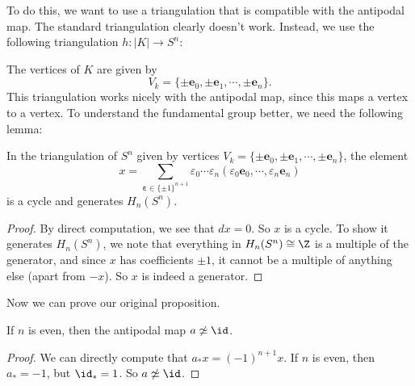 \documentclass[a4paper]{article}
\begin{document}
To do this, we want to use a triangulation that is compatible with the antipodal map. The standard triangulation clearly doesn't work. Instead, we use the following triangulation $h: |K| \to S^n$:
\begin{center}
\end{center}
The vertices of $K$ are given by
\[
  V_k = \{\pm\mathbf{e}_0, \pm \mathbf{e}_1, \cdots, \pm\mathbf{e}_n\}.
\]
This triangulation works nicely with the antipodal map, since this maps a vertex to a vertex. To understand the fundamental group better, we need the following lemma:

\begin{lemma}
  In the triangulation of $S^n$ given by vertices $V_k = \{\pm\mathbf{e}_0, \pm \mathbf{e}_1, \cdots, \pm\mathbf{e}_n\}$, the element
  \[
    x = \sum_{\boldsymbol\varepsilon \in \{\pm 1\}^{n + 1}} \varepsilon_0 \cdots \varepsilon_n (\varepsilon_0 \mathbf{e}_0, \cdots, \varepsilon_n \mathbf{e}_n)
  \]
  is a cycle and generates $H_n(S^n)$.
\end{lemma}

\begin{proof}
  By direct computation, we see that $d x = 0$. So $x$ is a cycle. To show it generates $H_n(S^n)$, we note that everything in $H_n(S^n) \cong \Z$ is a multiple of the generator, and since $x$ has coefficients $\pm 1$, it cannot be a multiple of anything else (apart from $-x$). So $x$ is indeed a generator.
\end{proof}

Now we can prove our original proposition.
\begin{prop}
  If $n$ is even, then the antipodal map $a \not\simeq \id$.
\end{prop}

\begin{proof}
  We can directly compute that $a_* x = (- 1)^{n + 1}x$. If $n$ is even, then $a_* = -1$, but $\id_* = 1$. So $a \not\simeq \id$.
\end{proof}
\end{document}
